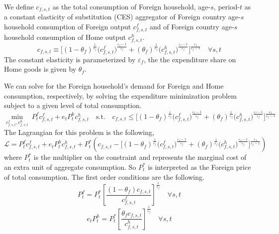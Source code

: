 \documentclass[letterpaper,12pt]{article}
\theoremstyle{definition}
\newcommand\ve{\varepsilon}
\begin{document}
    We define $c_{f,s,t}$ as the total consumption of Foreign household, age-$s$, period-$t$ as a constant elasticity of substitution (CES) aggregator of Foreign country age-$s$ household consumption of Foreign output $c^f_{f,s,t}$ and of Foreign country age-$s$ household consumption of Home output $c^h_{f,s,t}$.
    \begin{equation}\label{EqLgOpenHHcfCES}
      c_{f,s,t}\equiv \biggl[(1 - \theta_f)^\frac{1}{\ve_f}\bigl(c^f_{f,s,t}\bigr)^\frac{\ve_f-1}{\ve_f} + (\theta_f)^\frac{1}{\ve_f}\bigl(c^h_{f,s,t}\bigr)^\frac{\ve_f-1}{\ve_f}\biggr]^\frac{\ve_f}{\ve_f-1} \quad\forall s,t
    \end{equation}
    The constant elasticity is parameterized by $\ve_f$, the the expenditure share on Home goods is given by $\theta_f$.

    We can solve for the Foreign household's demand for Foreign and Home consumption, respectively, by solving the expenditure minimization problem subject to a given level of total consumption.
    \begin{equation}\label{EqLgOpenHHminprobF}
      \min_{c^f_{f,s,t},c^h_{f,s,t}} \: P^f_t c^f_{f,s,t} + e_t P^h_t c^h_{f,s,t} \quad \text{s.t.} \quad c_{f,s,t} \leq \biggl[(1 - \theta_f)^\frac{1}{\ve_f}\bigl(c^f_{f,s,t}\bigr)^\frac{\ve_f-1}{\ve_f} + (\theta_f)^\frac{1}{\ve_f}\bigl(c^h_{f,s,t}\bigr)^\frac{\ve_f-1}{\ve_f}\biggr]^\frac{\ve_f}{\ve_f-1}
    \end{equation}
    The Lagrangian for this problem is the following,
    \begin{equation}\label{EqLgOpenHHlagrF}
      \mathcal{L} = P^f_t c^f_{f,s,t} + e_t P^h_t c^h_{f,s,t} + P^*_t\left(c_{f,s,t} - \biggl[(1 - \theta_f)^\frac{1}{\ve_f}\bigl(c^f_{f,s,t}\bigr)^\frac{\ve_f-1}{\ve_f} + (\theta_f)^\frac{1}{\ve_f}\bigl(c^h_{f,s,t}\bigr)^\frac{\ve_f-1}{\ve_f}\biggr]^\frac{\ve_f}{\ve_f-1}\right)
    \end{equation}
    where $P^*_t$ is the multiplier on the constraint and represents the marginal cost of an extra unit of aggregate consumption. So $P^*_t$ is interpreted as the Foreign price of total consumption. The first order conditions are the following.
    \begin{equation}\label{EqLgOpenHHfocCff}
      P^f_t = P^*_t\left[\frac{(1-\theta_f) c_{f,s,t}}{c^f_{f,s,t}}\right]^{\frac{1}{\ve_f}} \quad\forall s,t
    \end{equation}
    \begin{equation}\label{EqLgOpenHHfocCfh}
      e_t P^h_t = P^*_t\left[\frac{\theta_f c_{f,s,t}}{c^h_{f,s,t}}\right]^{\frac{1}{\ve_f}} \quad\forall s,t
    \end{equation}
\end{document}
